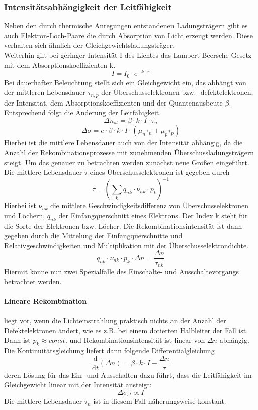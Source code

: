 \subsubsection{Intensitätsabhängigkeit der Leitfähigkeit}
Neben den durch thermische Anregungen entstandenen Ladungsträgern gibt es auch Elektron-Loch-Paare die durch Absorption von Licht erzeugt werden. Diese verhalten sich ähnlich der Gleichgewichtsladungsträger. \\
Weiterhin gilt bei geringer Intensität I des Lichtes das Lambert-Beersche Gesetz mit dem Absorptionskoeffizienten k.
$$I = I_0 \cdot e^{-k \cdot x} $$
Bei dauerhafter Beleuchtung stellt sich ein Gleichgewicht ein, das abhängt von der mittleren Lebensdauer $\tau _{n,p}$ der Überschusselektronen bzw. -defektelektronen, der Intensität, dem Absorptionskoeffizienten und der Quantenausbeute $\beta$. Entsprechend folgt die Änderung der Leitfähigkeit.
$$\Delta n_{st} = \beta \cdot k \cdot I \cdot \tau _n $$
$$\Delta \sigma =e \cdot \beta \cdot k \cdot I \cdot (\mu _n \tau _n + \mu _p \tau _p)$$
Hierbei ist die mittlere Lebensdauer auch von der Intensität abhängig, da die Anzahl der Rekombinationsprozesse mit zunehmenden Überschussladungsträgern steigt. Um das genauer zu betrachten werden zunächst neue Größen eingeführt. \\
Die mittlere Lebensdauer $\tau$ eines Überschusselektronen ist gegeben durch
$$\tau = (\sum _k q_{nk} \cdot \nu _{nk} \cdot p_k)^{-1} $$
Hierbei ist $\nu _{nk}$ die mittlere Geschwindigkeitsdifferenz von Überschusselektronen und Löchern, $q_{nk}$ der Einfangquerschnitt eines Elektrons. Der Index k steht für die Sorte der Elektronen bzw. Löcher. Die Rekombinationsintensität ist dann gegeben durch die Mittelung der Einfangquerschnitte und Relativgeschwindigkeiten und Multiplikation mit der Überschusselektrondichte. 
$$\overline{q_{nk} \cdot \nu _{nk}} \cdot p_k \cdot \Delta n = \frac{\Delta n}{\tau _{nk}} $$
Hiermit könne nun zwei Spezialfälle des Einschalte- und Ausschaltevorgangs betrachtet werden. 
\paragraph{Lineare Rekombination} liegt vor, wenn die Lichteinstrahlung praktisch nichts an der Anzahl der Defektelektronen ändert, wie es z.B. bei einem dotierten Halbleiter der Fall ist. Dann ist $p_k \approx const.$ und Rekombinationsintensität ist linear von $\Delta n$ abhängig. \\
Die Kontinuitätsgleichung liefert dann folgende Differentialgleichung
$$\frac{\mathrm{d}}{\mathrm{d} t} (\Delta n) = \beta \cdot k \cdot I - \frac{\Delta n}{\tau} $$
deren Lösung für das Ein- und Ausschalten dazu führt, dass die Leitfähigkeit im Gleichgewicht linear mit der Intensität ansteigt:
$$\Delta \sigma _{st} \propto I $$
Die mittlere Lebensdauer $\tau _n$ ist in diesem Fall näherungsweise konstant.

